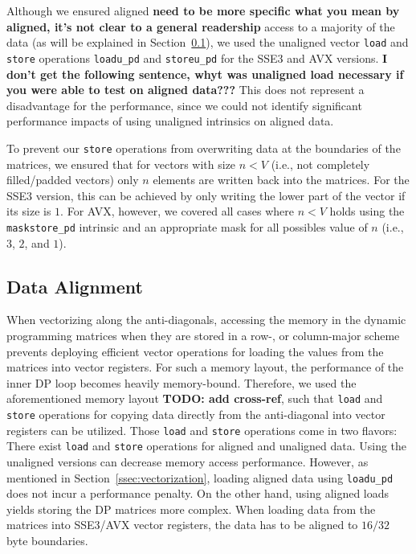 \documentclass[runningheads,a4paper]{llncs}
\begin{document}
Although we ensured aligned {\bf need to be more specific what you mean by aligned, it's not clear to a general readership} 
access to a majority of the data (as will be explained in
Section~\ref{ssec:dataalignment}), we used the unaligned vector \texttt{load} and \texttt{store}
operations \texttt{loadu\_pd} and \texttt{storeu\_pd} for the SSE3 and AVX versions. 
{\bf I don't get the following sentence, whyt was unaligned load necessary if you were able to test on aligned data???} 
This does not represent a disadvantage for the
performance, since we could not identify significant performance impacts of
using unaligned intrinsics on aligned data.

To prevent our \texttt{store} operations from overwriting data at the boundaries
of the matrices, we ensured that for vectors with size $n < V$ (i.e.,
not completely filled/padded vectors) only $n$ elements are written back into the
matrices.  For the SSE3 version, this can be achieved by only writing the lower
part of the vector if its size is $1$.  For AVX, however, we covered all cases
where $n < V$ holds using the \texttt{maskstore\_pd} intrinsic and an appropriate mask
for all possibles value of $n$ (i.e., $3$, $2$, and $1$).

\subsection{Data Alignment}
\label{ssec:dataalignment}

When vectorizing along the anti-diagonals, accessing the memory in the dynamic programming matrices when they are stored in a row-, or column-major scheme 
prevents deploying efficient vector operations for loading the values from the matrices into vector registers. 
For such a memory layout, the performance of the inner DP loop becomes heavily memory-bound. 
Therefore, we used the aforementioned memory layout {\bf TODO: add cross-ref}, such that \texttt{load} and \texttt{store} operations for copying data directly from the anti-diagonal 
into vector registers can be utilized. 
Those \texttt{load} and \texttt{store} operations come in two flavors: There exist \texttt{load} and \texttt{store} operations for aligned and unaligned data. 
Using the unaligned versions can decrease memory access performance. However, 
as mentioned in Section~\ref{ssec:vectorization}, loading aligned data using \texttt{loadu\_pd} does not incur a performance penalty. 
On the other hand, using aligned loads yields storing the DP matrices more complex. 
When loading data from the matrices into SSE3/AVX vector registers, the data has to be aligned to $16/32$ byte boundaries.
\end{document}
